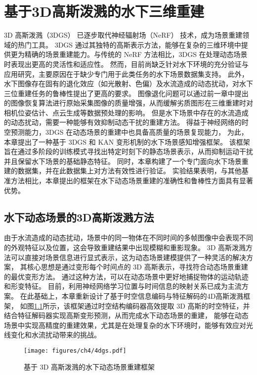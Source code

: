 
\chapter{基于3D高斯泼溅的水下三维重建}
3D 高斯泼溅（3DGS）\cite{3DGS} 已逐步取代神经辐射场（NeRF）\cite{nerf} 技术，成为场景重建领域的热门工具。
3DGS 通过其独特的高斯表示方法，能够在复杂的三维环境中提供更为精确的场景重建能力。与传统的 NeRF 方法相比，3DGS 在处理动态场景时表现出更高的灵活性和适应性。
然而，目前尚缺乏针对水下环境的充分验证与应用研究，主要原因在于缺少专门用于此类任务的水下场景数据集支持。
此外，水下图像存在固有的退化效应（如光散射、色偏）及水流造成的动态扰动，对水下三位重建任务的鲁棒性提出了更高的要求。
图像退化问题可以通过前一章中提出的图像恢复算法进行原始采集图像的质量增强，从而缓解劣质图形在三维重建时对相机位姿估计、点云生成等数据预处理的影响。
但是水下场景中存在的水流造成的动态扰动，需要一种能够有效抑制动态干扰的重建方法。
得益于神经网络的时空预测能力，3DGS 在动态场景的重建中也具备高质量的场景复现能力，
为此，本章提出了一种基于 3DGS 和 KAN \cite{kan}变形机制的水下场景感知增强框架。
该框架旨在通过多阶段的训练模式寻找出特定时刻下的静态场景表示，从而抑制运动干扰并且保留水下场景的基础静态特征。
同时，本章构建了一个专门面向水下场景重建的数据集，并在此数据集上对方法有效性进行验证。
实验结果表明，与其他基准方法相比，本章提出的框架在水下动态场景重建的准确性和鲁棒性方面具有显著优势。

\section{水下动态场景的3D高斯泼溅方法} \label{sec:4dgs}
由于水流造成的动态扰动，场景中的同一物体在不同时间的多帧图像中会表现不同的外观特征以及位置，这会导致重建结果中出现模糊和重影现象。
3D 高斯泼溅方法可以直接对场景信息进行显式表示，这为动态场景建模提供了一种灵活的解决方案，
其核心思想是通过变形每个时间点的 3D 高斯表示，寻找符合动态场景重建的最优变形方法。
通过这种方法，可以在动态场景中更好地捕捉物体的运动轨迹和形变特征。
目前，利用神经网络学习位置与时间信息的映射关系已成为主流方案。
在此基础上，本章重新设计了基于时空信息编码与特征解码的4D高斯泼溅\cite{4DGS}框架，
如图\ref{img:4dgs}所示，该框架通过时空结构编码器高效提取 3D 高斯的时空特征，并结合特征解码器实现高斯变形预测，从而完成水下动态场景的重建，
能够在动态场景中实现高精度的重建效果，尤其是在处理复杂的水下环境时，能够有效应对光线变化和水流扰动带来的挑战。
\begin{figure}[ht]
    \centering
    \texttt{[image: figures/ch4/4dgs.pdf]}
    \vspace{4mm}
    \caption{基于 3D 高斯泼溅的水下动态场景重建框架}
    \label{img:4dgs}
    \vspace{4mm}
\end{figure}

